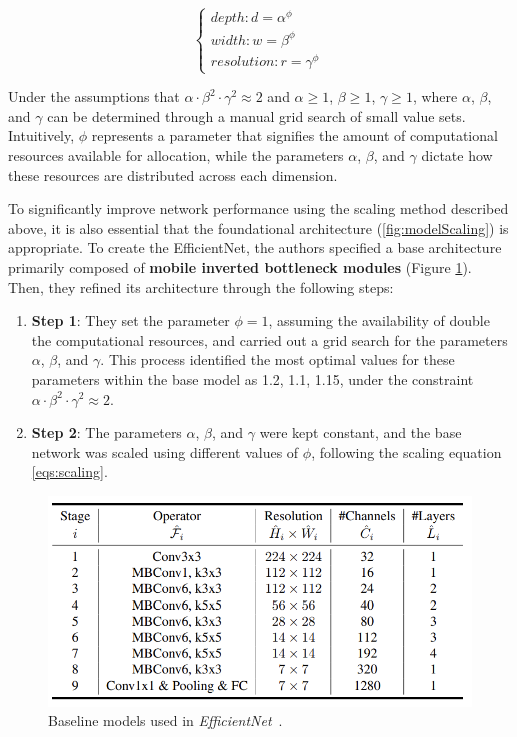 \begin{equation}
    \begin{cases}
      depth: d = \alpha^\phi\\
      width: w = \beta^\phi\\
      resolution: r = \gamma^\phi
    \end{cases}\,
    \label{eqs:scaling}
\end{equation}

Under the assumptions that $\alpha \cdot \beta^2 \cdot \gamma^2 \approx 2$ and $\alpha \geq 1$, $\beta \geq 1$, $\gamma \geq 1$, where $\alpha$, $\beta$, and $\gamma$ can be determined through a manual grid search of small value sets. Intuitively, $\phi$ represents a parameter that signifies the amount of computational resources available for allocation, while the parameters $\alpha$, $\beta$, and $\gamma$ dictate how these resources are distributed across each dimension.

To significantly improve network performance using the scaling method described above, it is also essential that the foundational architecture (\ref{fig:modelScaling}) is appropriate. To create the EfficientNet, the authors specified a base architecture primarily composed of \textbf{mobile inverted bottleneck modules} (Figure \ref{fig:efficientNetBasicModel}). Then, they refined its architecture through the following steps:
\begin{enumerate}
    \item \textbf{Step 1}: They set the parameter $\phi = 1$, assuming the availability of double the computational resources, and carried out a grid search for the parameters $\alpha$, $\beta$, and $\gamma$. This process identified the most optimal values for these parameters within the base model as 1.2, 1.1, 1.15, under the constraint $\alpha \cdot \beta^2 \cdot \gamma^2 \approx 2$.
    \item \textbf{Step 2}: The parameters $\alpha$, $\beta$, and $\gamma$ were kept constant, and the base network was scaled using different values of $\phi$, following the scaling equation \ref{eqs:scaling}.
\end{enumerate}

\begin{figure}[!htb]
    \centering
    \includegraphics[scale=1]{Images/efficient-net-base-model.png}
    \caption{Baseline models used in \textit{EfficientNet}~\cite{EfficientNet}.}
    \label{fig:efficientNetBasicModel}
\end{figure}

